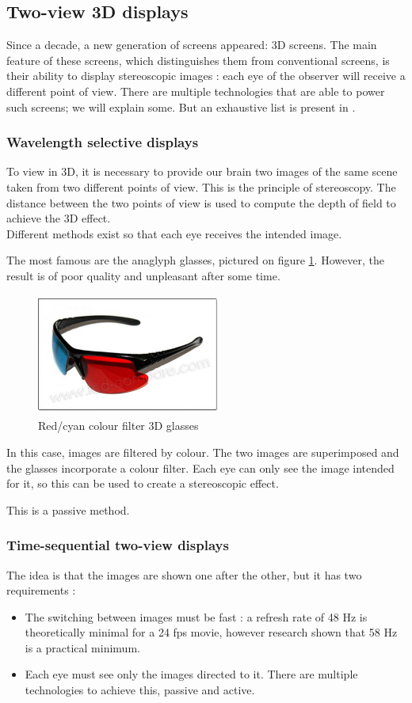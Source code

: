 \subsection{Two-view 3D displays}
Since a decade, a new generation of screens appeared: 3D screens. The main feature of these screens, which distinguishes them from conventional screens, is their ability to display stereoscopic images : each eye of the observer will receive a different point of view.
There are multiple technologies that are able to power such screens; we will explain some. But an exhaustive list is present in \cite{mehrabi2013making}.

\subsubsection{Wavelength selective displays}
To view in 3D, it is necessary to provide our brain two images of the same scene taken from two different points of view. This is the principle of stereoscopy. The distance between the two points of view is used to compute the depth of field to achieve the 3D effect.\\
Different methods exist so that each eye receives the intended image. 

The most famous are the anaglyph glasses, pictured on figure \ref{fig:anaglass}. However, the result is of poor quality and unpleasant after some time.

\begin{figure}[h!]
\centering
\centering\includegraphics[width=6cm,height=40mm]{image/1.jpg}
\caption{Red/cyan colour filter 3D glasses}
\label{fig:anaglass}
\end{figure}

In this case, images are filtered by colour. The two images are superimposed and the glasses incorporate a colour filter. Each eye can only see the image intended for it, so this can be used to create a stereoscopic effect. 

This is a passive method.

\subsubsection{Time-sequential two-view displays}
The idea is that the images are shown one after the other, but it has two requirements : 
\begin{itemize}
\item The switching between images must be fast : a refresh rate of 48 Hz is theoretically minimal for a 24 fps movie, however research \cite{holliman2011three} shown that 58 Hz is a practical minimum.
\item Each eye must see only the images directed to it. There are multiple technologies to achieve this, passive and active.
\end{itemize}

